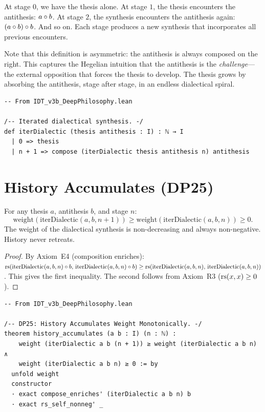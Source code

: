At stage $0$, we have the thesis alone.  At stage $1$, the thesis
encounters the antithesis: $a \circ b$.  At stage $2$, the
synthesis encounters the antithesis again: $(a \circ b) \circ b$.
And so on.  Each stage produces a new synthesis that incorporates all
previous encounters.

Note that this definition is asymmetric: the antithesis is always composed
on the right.  This captures the Hegelian intuition that the antithesis is
the \emph{challenge}---the external opposition that forces the thesis to
develop.  The thesis grows by absorbing the antithesis, stage after stage,
in an endless dialectical spiral.

\begin{lstlisting}
-- From IDT_v3b_DeepPhilosophy.lean

/-- Iterated dialectical synthesis. -/
def iterDialectic (thesis antithesis : I) : ℕ → I
  | 0 => thesis
  | n + 1 => compose (iterDialectic thesis antithesis n) antithesis
\end{lstlisting}

\section{History Accumulates (DP25)}

\begin{theorem}
\label{thm:history-accumulates}
For any thesis $a$, antithesis $b$, and stage $n$:
\[
\mathrm{weight}(\mathrm{iterDialectic}(a, b, n+1)) \geq
\mathrm{weight}(\mathrm{iterDialectic}(a, b, n)) \geq 0.
\]
The weight of the dialectical synthesis is non-decreasing and always
non-negative.  History never retreats.
\end{theorem}

\begin{proof}
By Axiom~E4 (composition enriches):
$\mathrm{rs}(\mathrm{iterDialectic}(a,b,n) \circ b,\,
\mathrm{iterDialectic}(a,b,n) \circ b) \geq
\mathrm{rs}(\mathrm{iterDialectic}(a,b,n),\, \mathrm{iterDialectic}(a,b,n))$.
This gives the first inequality.  The second follows from
Axiom~R3 ($\mathrm{rs}(x,x) \geq 0$).
\end{proof}

\begin{lstlisting}
-- From IDT_v3b_DeepPhilosophy.lean

/-- DP25: History Accumulates Weight Monotonically. -/
theorem history_accumulates (a b : I) (n : ℕ) :
    weight (iterDialectic a b (n + 1)) ≥ weight (iterDialectic a b n) ∧
    weight (iterDialectic a b n) ≥ 0 := by
  unfold weight
  constructor
  · exact compose_enriches' (iterDialectic a b n) b
  · exact rs_self_nonneg' _
\end{lstlisting}

